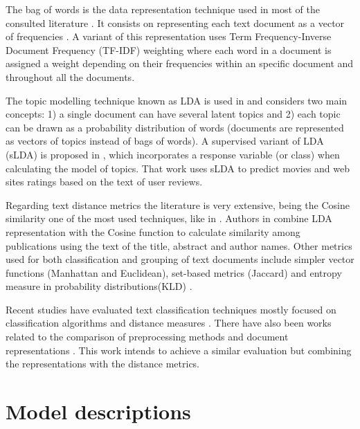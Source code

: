 \documentclass[preprint,12pt,3p]{elsarticle}
\begin{document}
The bag of words is the data representation technique used in most of the consulted literature \cite{aggarwal2015data,soto2015similarity,uysal2014impact,kim2017bag,srivastava2009text, onan2016ensemble}. It consists on representing each text document as a vector of frequencies \cite{aggarwal2015data}. A variant of this representation uses Term Frequency-Inverse Document Frequency (TF-IDF) weighting \cite{onan2016ensemble,soto2015similarity} where each word in a document is assigned a weight depending on their frequencies within an specific document and throughout all the documents.\par

The topic modelling technique known as LDA is used in \cite{pavlinek2017text,bae2014computing} and considers two main concepts: 1) a single document can have several latent topics and 2) each topic can be drawn as a probability distribution of words (documents are represented as vectors of topics instead of bags of words). A supervised variant of LDA (sLDA) is proposed in \cite{mcauliffe2008supervised}, which incorporates a response variable (or class) when calculating the model of topics. That work uses sLDA to predict movies and web sites ratings based on the text of user reviews.\par

Regarding text distance metrics the literature is very extensive, being the Cosine similarity one of the most used techniques, like in \cite{liebman2016capturing,soto2015similarity}. Authors in \cite{bae2014computing} combine LDA representation with the Cosine function to calculate similarity among publications using the text of the title, abstract and author names. Other metrics used for both classification and grouping of text documents include simpler vector functions (Manhattan and Euclidean), set-based metrics (Jaccard) and entropy measure in probability distributions(KLD) \cite{liebman2016capturing,soto2015similarity, kocher2017distance}.\par

Recent studies have evaluated text classification techniques mostly focused on classification algorithms \cite{vijayan2017text} and distance measures \cite{kocher2017distance}. There have also been works related to the comparison of preprocessing methods and document representations \cite{kim2017bag,uysal2014impact}. This work intends to achieve a similar evaluation but combining the representations with the distance metrics.

\section{Model descriptions}
\label{model_descriptions}
\end{document}
